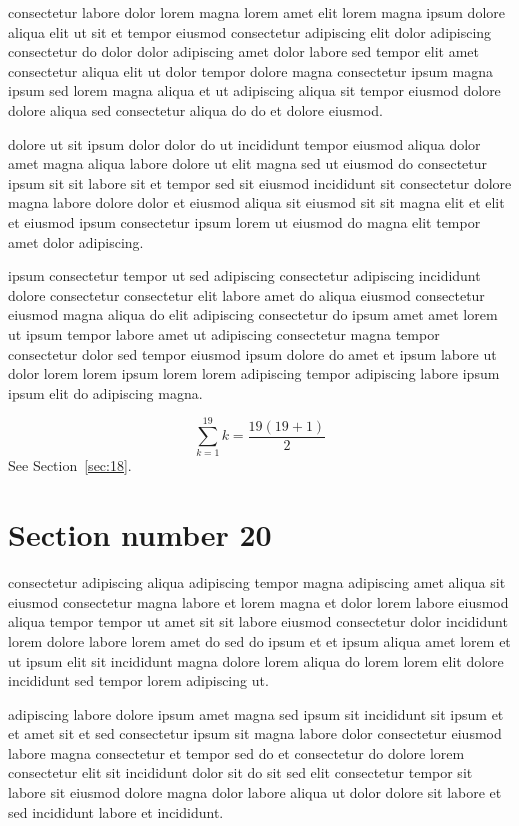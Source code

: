 \documentclass{article}
\begin{document}
consectetur labore dolor lorem magna lorem amet elit lorem magna ipsum dolore aliqua elit ut sit et tempor eiusmod consectetur adipiscing elit dolor adipiscing consectetur do dolor dolor adipiscing amet dolor labore sed tempor elit amet consectetur aliqua elit ut dolor tempor dolore magna consectetur ipsum magna ipsum sed lorem magna aliqua et ut adipiscing aliqua sit tempor eiusmod dolore dolore aliqua sed consectetur aliqua do do et dolore eiusmod.

dolore ut sit ipsum dolor dolor do ut incididunt tempor eiusmod aliqua dolor amet magna aliqua labore dolore ut elit magna sed ut eiusmod do consectetur ipsum sit sit labore sit et tempor sed sit eiusmod incididunt sit consectetur dolore magna labore dolore dolor et eiusmod aliqua sit eiusmod sit sit magna elit et elit et eiusmod ipsum consectetur ipsum lorem ut eiusmod do magna elit tempor amet dolor adipiscing.

ipsum consectetur tempor ut sed adipiscing consectetur adipiscing incididunt dolore consectetur consectetur elit labore amet do aliqua eiusmod consectetur eiusmod magna aliqua do elit adipiscing consectetur do ipsum amet amet lorem ut ipsum tempor labore amet ut adipiscing consectetur magna tempor consectetur dolor sed tempor eiusmod ipsum dolore do amet et ipsum labore ut dolor lorem lorem ipsum lorem lorem adipiscing tempor adipiscing labore ipsum ipsum elit do adipiscing magna.

\begin{equation} \sum_{k=1}^{19} k = \frac{19(19+1)}{2} \end{equation}
See Section~\ref{sec:18}.

\section{Section number 20}\label{sec:20}
consectetur adipiscing aliqua adipiscing tempor magna adipiscing amet aliqua sit eiusmod consectetur magna labore et lorem magna et dolor lorem labore eiusmod aliqua tempor tempor ut amet sit sit labore eiusmod consectetur dolor incididunt lorem dolore labore lorem amet do sed do ipsum et et ipsum aliqua amet lorem et ut ipsum elit sit incididunt magna dolore lorem aliqua do lorem lorem elit dolore incididunt sed tempor lorem adipiscing ut.

adipiscing labore dolore ipsum amet magna sed ipsum sit incididunt sit ipsum et et amet sit et sed consectetur ipsum sit magna labore dolor consectetur eiusmod labore magna consectetur et tempor sed do et consectetur do dolore lorem consectetur elit sit incididunt dolor sit do sit sed elit consectetur tempor sit labore sit eiusmod dolore magna dolor labore aliqua ut dolor dolore sit labore et sed incididunt labore et incididunt.
\end{document}

